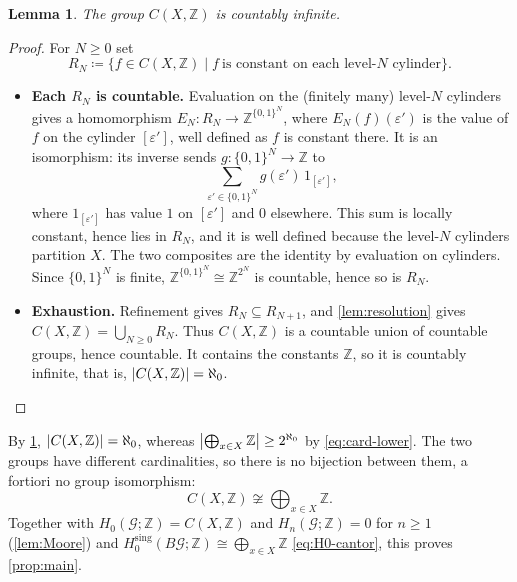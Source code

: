 \documentclass{extracta-temp-26}
\numberwithin{equation}{section}
\newtheorem{lem}[teo]{Lemma}
\theoremstyle{definition}
\theoremstyle{remark}
\newcommand{\G}{\mathcal{G}}
\newcommand{\Z}{\mathbb{Z}}
\newcommand{\Hsing}{H^{\mathrm{sing}}}
\DeclarePairedDelimiter{\abs}{\lvert}{\rvert}
\newcommand{\step}[1]{\textbf{#1}}
\begin{document}
\begin{lem}\label{lem:countable}
The group \(C(X,\Z)\) is countably infinite.
\end{lem}

\begin{proof}
For \(N\ge 0\) set
\begin{equation}\label{eq:RN}
R_N\coloneqq\{f\in C(X,\Z)\mid f\ \text{is constant on each level-\(N\) cylinder}\}.
\end{equation}
\begin{itemize}
\item \step{Each \(R_N\) is countable.}
Evaluation on the (finitely many) level-\(N\) cylinders gives a homomorphism \(E_N\colon R_N\to\Z^{\{0,1\}^N}\), where \(E_N(f)(\varepsilon')\) is the value of \(f\) on the cylinder \([\varepsilon']\), well defined as \(f\) is constant there.
It is an isomorphism: its inverse sends \(g\colon\{0,1\}^N\to\Z\) to
\begin{equation}\label{eq:RN-inverse}
\sum_{\varepsilon'\in\{0,1\}^N}g(\varepsilon')\,1_{[\varepsilon']},
\end{equation}
where \(1_{[\varepsilon']}\) has value \(1\) on \([\varepsilon']\) and \(0\) elsewhere.
This sum is locally constant, hence lies in \(R_N\), and it is well defined because the level-\(N\) cylinders partition \(X\).
The two composites are the identity by evaluation on cylinders.
Since \(\{0,1\}^N\) is finite, \(\Z^{\{0,1\}^N}\cong\Z^{2^N}\) is countable, hence so is \(R_N\).
\item \step{Exhaustion.}
Refinement gives \(R_N\subseteq R_{N+1}\), and \cref{lem:resolution} gives \(C(X,\Z)=\bigcup_{N\ge0}R_N\).
Thus \(C(X,\Z)\) is a countable union of countable groups, hence countable.
It contains the constants \(\Z\), so it is countably infinite, that is, \(\abs{C(X,\Z)}=\aleph_0\).\qedhere
\end{itemize}
\end{proof}

By \cref{lem:countable}, \(\abs{C(X,\Z)}=\aleph_0\), whereas \(\abs[\big]{\bigoplus_{x\in X}\Z}\ge 2^{\aleph_0}\) by \eqref{eq:card-lower}.
The two groups have different cardinalities, so there is no bijection between them, a fortiori no group isomorphism:
\begin{equation}\label{eq:noniso}
C(X,\Z)\not\cong\bigoplus_{x\in X}\Z.
\end{equation}
Together with \(H_0(\G;\Z)=C(X,\Z)\) and \(H_n(\G;\Z)=0\) for \(n\ge 1\) (\cref{lem:Moore}) and \(\Hsing_0(B\G;\Z)\cong\bigoplus_{x\in X}\Z\) \eqref{eq:H0-cantor}, this proves \cref{prop:main}.
\end{document}
